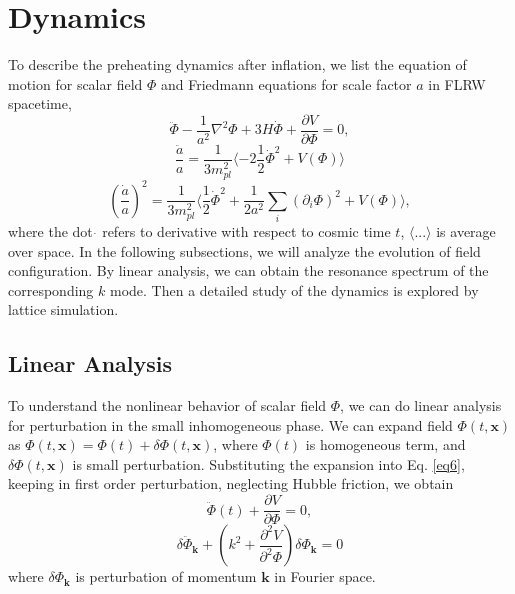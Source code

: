 \documentclass[12pt, a4paper]{article}
\begin{document}
\section{Dynamics}\label{section:B}

To describe the preheating dynamics after inflation, we list the equation of motion for scalar field $\Phi$ and Friedmann equations for scale factor $a$ in FLRW spacetime,
\begin{equation}
  \label{eq6}
  \ddot{\Phi}-\frac{1}{a^2}\nabla^2\Phi+3H\dot{\Phi}+\frac{\partial V}{\partial \Phi}=0,
\end{equation}
\begin{equation}
  \label{eq7}
  \frac{\ddot{a}}{a}=\frac{1}{3 m_{pl}^2}\langle -2 \frac{1}{2}\dot{\Phi}^2+V\left(\Phi\right)\rangle
\end{equation}
\begin{equation}
  \label{eq8}
  \left(\frac{\dot{a}}{a}\right)^2=\frac{1}{3m_{pl}^2}\langle \frac{1}{2}\dot{\Phi}^2+\frac{1}{2a^2}\sum_i \left(\partial_i\Phi\right)^2+V\left(\Phi\right)\rangle ,
\end{equation}
where the dot $\dot{}$ refers to derivative with respect to cosmic time $t$, $ \langle ... \rangle $ is average over space. In the following subsections, we will analyze the evolution of field configuration. By linear analysis, we can obtain the resonance spectrum of the corresponding $k$ mode. Then a detailed study of the dynamics is explored by lattice simulation.

\subsection{Linear Analysis}

To understand the nonlinear behavior of scalar field $\Phi$, we can do linear analysis for perturbation in the small inhomogeneous phase. We can expand field $\Phi\left(t,\bm{x}\right)$ as $\Phi\left(t,\bm{x}\right)=\Phi\left(t\right)+\delta\Phi\left(t,\bm{x}\right)$, where $\Phi\left(t\right)$ is homogeneous term, and $\delta\Phi\left(t,\bm{x}\right)$ is small perturbation.
Substituting the expansion into Eq. \ref{eq6}, keeping in first order perturbation, neglecting Hubble friction, we obtain
\begin{equation}
  \label{eq9}
  \ddot{\Phi}\left(t\right)+\frac{\partial V}{\partial \Phi}=0,
\end{equation}
\begin{equation}
  \label{eq10}
  \delta\ddot{\Phi}_{\bm{k}}+\left(k^2+\frac{\partial^2 V}{\partial^2\Phi}\right)\delta\Phi_{\bm{k}}=0
\end{equation}
where $\delta\Phi_{\bm{k}}$ is perturbation of momentum $\bm{k}$ in Fourier space.
\end{document}
